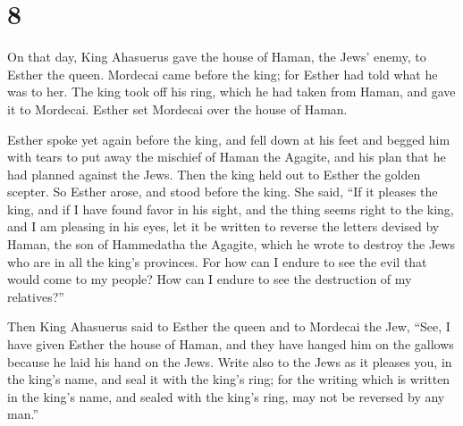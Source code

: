 \hypertarget{section-7}{%
\section{8}\label{section-7}}

 On that day, King Ahasuerus gave the house of Haman, the
Jews' enemy, to Esther the queen. Mordecai came before the king; for
Esther had told what he was to her.  The king took off his
ring, which he had taken from Haman, and gave it to Mordecai. Esther set
Mordecai over the house of Haman.

 Esther spoke yet again before the king, and fell down at
his feet and begged him with tears to put away the mischief of Haman the
Agagite, and his plan that he had planned against the Jews.
 Then the king held out to Esther the golden scepter. So
Esther arose, and stood before the king.  She said, ``If
it pleases the king, and if I have found favor in his sight, and the
thing seems right to the king, and I am pleasing in his eyes, let it be
written to reverse the letters devised by Haman, the son of Hammedatha
the Agagite, which he wrote to destroy the Jews who are in all the
king's provinces.  For how can I endure to see the evil
that would come to my people? How can I endure to see the destruction of
my relatives?''

 Then King Ahasuerus said to Esther the queen and to
Mordecai the Jew, ``See, I have given Esther the house of Haman, and
they have hanged him on the gallows because he laid his hand on the
Jews.  Write also to the Jews as it pleases you, in the
king's name, and seal it with the king's ring; for the writing which is
written in the king's name, and sealed with the king's ring, may not be
reversed by any man.''

